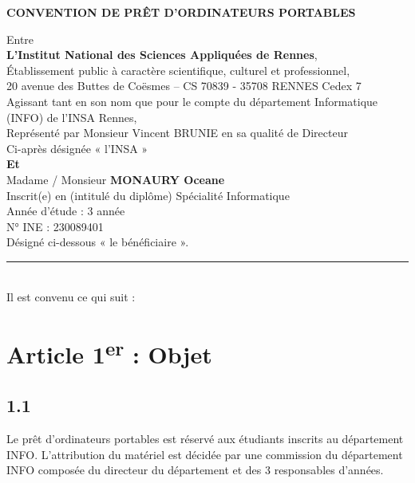 \documentclass[12pt,a4paper]{article}
\begin{document}
\begin{center}
    \Large \textbf{CONVENTION DE PRÊT D'ORDINATEURS PORTABLES}
\end{center}

\vspace{1cm}

Entre \\
\textbf{L’Institut National des Sciences Appliquées de Rennes},\\
Établissement public à caractère scientifique, culturel et professionnel, \\
20 avenue des Buttes de Coësmes -- CS 70839 - 35708 RENNES Cedex 7 \\

Agissant tant en son nom que pour le compte du département Informatique (INFO) de l’INSA Rennes, \\

Représenté par Monsieur Vincent BRUNIE en sa qualité de Directeur \\

Ci-après désignée « l’INSA » \\

\textbf{Et} \\

Madame / Monsieur \textbf{ MONAURY Oceane } \\
Inscrit(e) en (intitulé du diplôme) Spécialité Informatique \\
Année d’étude : 3 année\\
N° INE : 230089401 \\

Désigné ci-dessous « le bénéficiaire ». \\

\rule{\linewidth}{1pt} \\

Il est convenu ce qui suit :

\section*{Article 1\textsuperscript{er} : Objet}

\subsection*{1.1}
Le prêt d'ordinateurs portables est réservé aux étudiants inscrits au département INFO.  
L'attribution du matériel est décidée par une commission du département INFO composée du directeur du département et des 3 responsables d'années.
\end{document}
